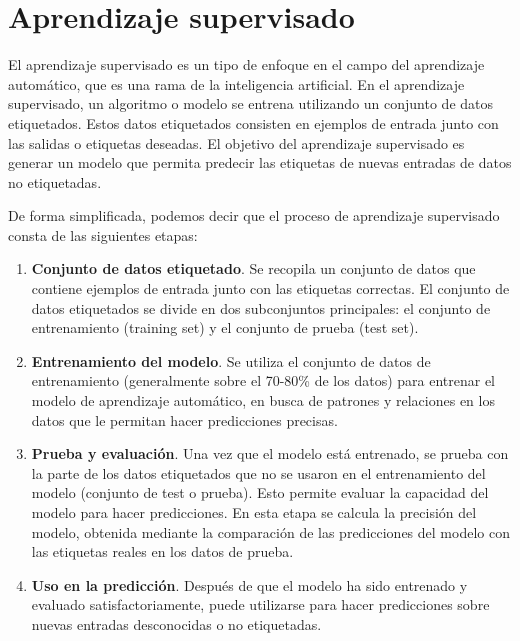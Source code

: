 \section{Aprendizaje supervisado}

El aprendizaje supervisado es un tipo de enfoque en el campo del aprendizaje automático, que es una rama de la inteligencia artificial. 
En el aprendizaje supervisado, un algoritmo o modelo se entrena utilizando un conjunto de datos etiquetados. 
Estos datos etiquetados consisten en ejemplos de entrada junto con las salidas o etiquetas deseadas. 
El objetivo del aprendizaje supervisado es generar un modelo que permita 
predecir las etiquetas de nuevas entradas de datos no etiquetadas.
\

De forma simplificada, podemos decir que el proceso de aprendizaje supervisado consta de las siguientes etapas: 

\begin{enumerate}
	\item \textbf{Conjunto de datos etiquetado}. Se recopila un conjunto de datos que contiene ejemplos de entrada 
	junto con las etiquetas correctas. El conjunto de datos etiquetados se divide en dos subconjuntos principales: 
	el conjunto de entrenamiento (training set) y el conjunto de prueba (test set). 
    \item \textbf{Entrenamiento del modelo}. Se utiliza el conjunto de datos de entrenamiento (generalmente sobre
	 el 70-80\% de los datos) para entrenar el modelo de aprendizaje automático, en busca de patrones y relaciones en los datos
	  que le permitan hacer predicciones precisas.
	\item \textbf{Prueba y evaluación}. Una vez que el modelo está entrenado, se prueba con la parte de los datos etiquetados 
	que no se usaron en el entrenamiento del modelo (conjunto de test o prueba). Esto permite evaluar la capacidad del 
	modelo para hacer predicciones. En esta etapa se calcula la precisión del modelo, obtenida mediante la comparación de
	 las predicciones del modelo con las etiquetas reales en los datos de prueba.
	\item \textbf{Uso en la predicción}. Después de que el modelo ha sido entrenado y evaluado satisfactoriamente, 
	puede utilizarse para hacer predicciones sobre nuevas entradas desconocidas o no etiquetadas. 
\end{enumerate}

